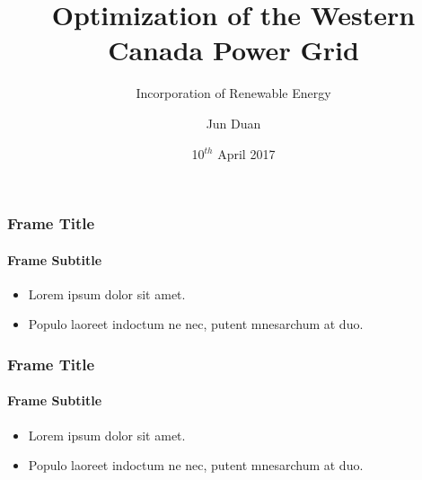 %
%



\title[Incorporation of Renewable Energy]{Optimization of the Western Canada Power Grid}
\subtitle{Incorporation of Renewable Energy}
\author[Jun Duan]{Jun Duan}
\date[2017-04-10]{10$^{th}$ April 2017}





{
%
\begin{frame}[plain]
	\titlepage
	\vspace{1.75cm} %
\end{frame}
}

\begin{frame}
	\frametitle{Frame Title}
	\framesubtitle{Frame Subtitle}
	\begin{itemize}
		\item Lorem ipsum dolor sit amet.
		\item Populo laoreet indoctum ne nec, putent mnesarchum at duo.
	\end{itemize}
\end{frame}

\begin{frame}
\frametitle{Frame Title}
\framesubtitle{Frame Subtitle}
\begin{itemize}
	\item Lorem ipsum dolor sit amet.
	\item Populo laoreet indoctum ne nec, putent mnesarchum at duo.
\end{itemize}
\end{frame}

